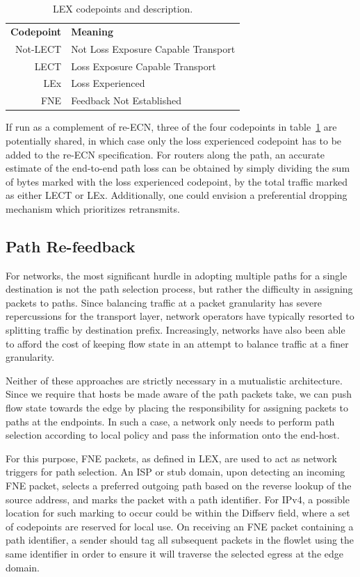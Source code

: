 \begin{table}
\centering
\begin{tabular}{r|l}
    \textbf{Codepoint} & \textbf{Meaning} \\
    Not-LECT & Not Loss Exposure Capable Transport \\
    LECT & Loss Exposure Capable Transport \\ 
    LEx  & Loss Experienced \\ 
    FNE  & Feedback Not Established \\
\end{tabular}
\caption{LEX codepoints and description.}
\label{table:codepoint}
\end{table}

If run as a complement of re-\ac{ECN}, three of the four codepoints in table~\ref{table:codepoint} are potentially shared, in which case only the loss experienced codepoint has to be added to the re-\ac{ECN} specification. For routers along the path, an accurate estimate of the end-to-end path loss can be obtained by simply dividing the sum of bytes marked with the loss experienced codepoint, by the total traffic marked as either \ac{LECT} or \ac{LEx}. Additionally, one could envision a preferential dropping mechanism which prioritizes retransmits.


\subsection{Path Re-feedback}

For networks, the most significant hurdle in adopting multiple paths for a single destination is not the path selection process, but rather the difficulty in assigning packets to paths. Since balancing traffic at a packet granularity has severe repercussions for the transport layer, network operators have typically resorted to splitting traffic by destination prefix. Increasingly, networks have also been able to afford the cost of keeping flow state in an attempt to balance traffic at a finer granularity. 

Neither of these approaches are strictly necessary in a mutualistic architecture. Since we require that hosts be made aware of the path packets take, we can push flow state towards the edge by placing the responsibility for assigning packets to paths at the endpoints.  In such a case, a network only needs to perform path selection according to local policy and pass the information onto the end-host.

For this purpose, \ac{FNE} packets, as defined in \ac{LEX}, are used to act as network triggers for path selection. An \ac{ISP} or stub domain, upon detecting an incoming \ac{FNE} packet, selects a preferred outgoing path based on the reverse lookup of the source address, and marks the packet with a path identifier. For \ac{IP}v4, a possible location for such marking to occur could be within the Diffserv field, where a set of codepoints are reserved for local use. On receiving an \ac{FNE} packet containing a path identifier, a sender should tag all subsequent packets in the flowlet using the same identifier in order to ensure it will traverse the selected egress at the edge domain.

